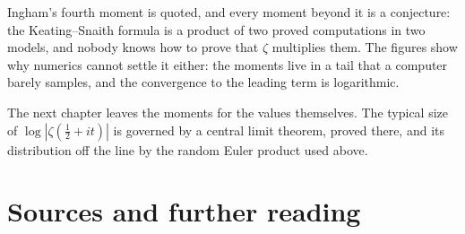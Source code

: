 Ingham's fourth moment is quoted, and every moment beyond it is a conjecture: the Keating--Snaith formula is a product of two proved computations in two models, and nobody knows how to prove that $\zeta$ multiplies them. The figures show why numerics cannot settle it either: the moments live in a tail that a computer barely samples, and the convergence to the leading term is logarithmic.

The next chapter leaves the moments for the values themselves. The typical size of $\log|\zeta(\frac12+it)|$ is governed by a central limit theorem, proved there, and its distribution off the line by the random Euler product used above.

\section*{Sources and further reading}

